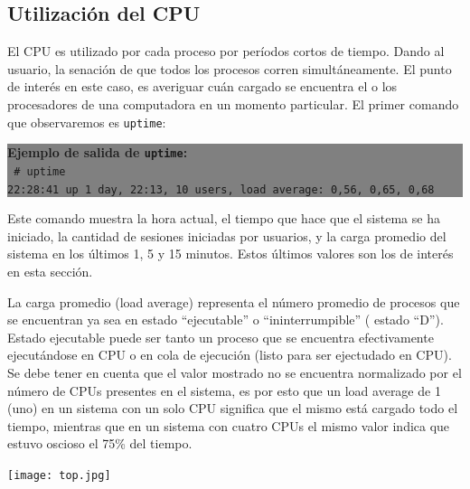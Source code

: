\documentclass[12pt]{article}
\begin{document}
\subsection*{Utilización del CPU}

El CPU es utilizado por cada proceso por períodos cortos de tiempo. Dando 
al usuario, la senación de que todos los procesos corren simultáneamente.
El punto de interés en este caso, es averiguar cuán cargado se encuentra
el o los procesadores de una computadora en un momento particular. El 
primer comando que observaremos es \texttt{uptime}:


\colorbox{grey}{\parbox[t]{0.95\linewidth}{ \vspace*{0.5cm} { 
{\bf Ejemplo de salida de \texttt{uptime}:} \\
{\tt
# uptime \\
 22:28:41 up 1 day, 22:13, 10 users,  load average: 0,56, 0,65, 0,68
}
} \vspace*{0.5cm} } } 

Este comando muestra la hora actual, el tiempo que hace que el sistema se 
ha iniciado, la cantidad de sesiones iniciadas por usuarios, y la carga promedio del sistema en los últimos 1, 5 y 15 minutos. Estos últimos valores
son los de interés en esta sección. 

La carga promedio (load average) representa el número promedio de procesos
que se encuentran ya sea en estado ``ejecutable'' o ``ininterrumpible'' (
estado ``D'').  Estado ejecutable puede ser tanto un proceso que se 
encuentra efectivamente ejecutándose en CPU o en cola de ejecución 
(listo para ser ejectudado en CPU).  Se debe tener en cuenta que el valor 
mostrado no se encuentra normalizado por el número de CPUs presentes en 
el sistema, es por esto que un load average de 1 (uno) en un sistema con 
un solo CPU significa que el mismo está cargado todo el tiempo, mientras 
que en un sistema con cuatro CPUs el mismo valor indica que estuvo oscioso
el 75\% del tiempo. 


\begin{center}
 \texttt{[image: top.jpg]}
\end{center}



\end{document}
